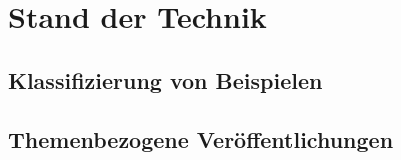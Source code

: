 \chapter{Stand der Technik}
\label{cha:stand_der_technik}

\section{Klassifizierung von Beispielen}
\label{sec:klassifizierung}

\section{Themenbezogene Veröffentlichungen}
\label{sec:themenbezogene_veroeffentlichungen}